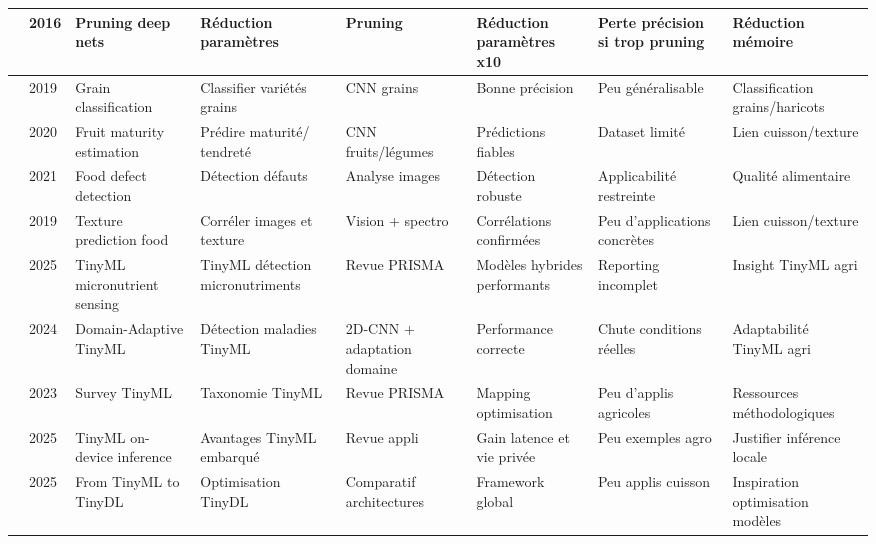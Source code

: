 \begin{table}[H]
\begin{tabularx}{\textwidth}{|p{0.5cm}|p{0.7cm}|p{2.0cm}|X|X|X|X|X|}
		\hline
		\cite{han2016deep}           & 2016           & Pruning deep nets            & Réduction paramètres             & Pruning                     & Réduction paramètres x10     & Perte précision si trop pruning & Réduction mémoire                \\
		\hline
		\cite{patel2019}             & 2019           & Grain classification         & Classifier variétés grains       & CNN grains                  & Bonne précision              & Peu généralisable               & Classification grains/haricots   \\
		\hline
		\cite{kaur2020}              & 2020           & Fruit maturity estimation    & Prédire maturité/ tendreté        & CNN fruits/légumes          & Prédictions fiables          & Dataset limité                  & Lien cuisson/texture             \\
		\hline
		\cite{gonzalezbarron2021}    & 2021           & Food defect detection        & Détection défauts                & Analyse images              & Détection robuste            & Applicabilité restreinte        & Qualité alimentaire              \\
		\hline
		\cite{yu2019}                & 2019           & Texture prediction food      & Corréler images et texture       & Vision + spectro            & Corrélations confirmées      & Peu d’applications concrètes    & Lien cuisson/texture             \\
		\hline
		\cite{moeketsi2025}          & 2025           & TinyML micronutrient sensing & TinyML détection micronutriments & Revue PRISMA                & Modèles hybrides performants & Reporting incomplet             & Insight TinyML agri              \\
		\hline
		\cite{kimutaiforster2024}    & 2024           & Domain-Adaptive TinyML       & Détection maladies TinyML        & 2D-CNN + adaptation domaine & Performance correcte         & Chute conditions réelles        & Adaptabilité TinyML agri         \\
		\hline
		\cite{capogrosso2023}        & 2023           & Survey TinyML                & Taxonomie TinyML                 & Revue PRISMA                & Mapping optimisation         & Peu d’applis agricoles          & Ressources méthodologiques       \\
		\hline
		\cite{heydari2025sensors}    & 2025           & TinyML on-device inference   & Avantages TinyML embarqué        & Revue appli                 & Gain latence et vie privée   & Peu exemples agro               & Justifier inférence locale       \\
		\hline
		\cite{sensors2025_tinydl}    & 2025           & From TinyML to TinyDL        & Optimisation TinyDL              & Comparatif architectures    & Framework global             & Peu applis cuisson              & Inspiration optimisation modèles \\
		\hline
	\end{tabularx}
\end{table}


